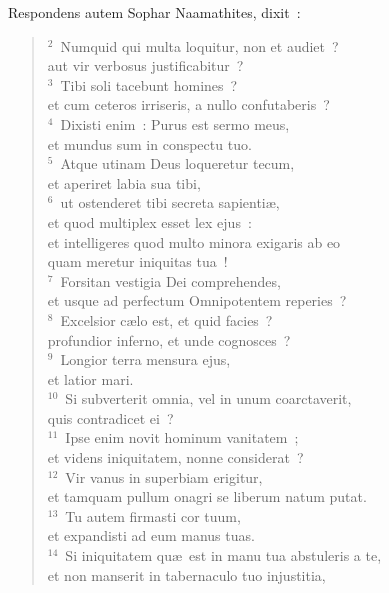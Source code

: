 \lettrine[lines=10,image=true,loversize=0.05,lraise=-0.03]{R}{}espondens autem Sophar Naamathites, dixit~:
\begin{flushleft}\begin{verse}\vspace{6pt}${}^{2}$~Numquid qui multa loquitur, non et audiet~?\\ aut vir verbosus justificabitur~?\\
${}^{3}$~Tibi soli tacebunt homines~?\\ et cum ceteros irriseris, a nullo confutaberis~?\\
${}^{4}$~Dixisti enim~: Purus est sermo meus,\\ et mundus sum in conspectu tuo.\\
${}^{5}$~Atque utinam Deus loqueretur tecum,\\ et aperiret labia sua tibi,\\
${}^{6}$~ut ostenderet tibi secreta sapienti\ae ,\\ et quod multiplex esset lex ejus~:\\ et intelligeres quod multo minora exigaris ab eo\\ quam meretur iniquitas tua~!\\
${}^{7}$~Forsitan vestigia Dei comprehendes,\\ et usque ad perfectum Omnipotentem reperies~?\\
${}^{8}$~Excelsior c\ae lo est, et quid facies~?\\ profundior inferno, et unde cognosces~?\\
${}^{9}$~Longior terra mensura ejus,\\ et latior mari.\\
${}^{10}$~Si subverterit omnia, vel in unum coarctaverit,\\ quis contradicet ei~?\\
${}^{11}$~Ipse enim novit hominum vanitatem~;\\ et videns iniquitatem, nonne considerat~?\\
${}^{12}$~Vir vanus in superbiam erigitur,\\ et tamquam pullum onagri se liberum natum putat.\\
${}^{13}$~Tu autem firmasti cor tuum,\\ et expandisti ad eum manus tuas.\\
${}^{14}$~Si iniquitatem qu\ae\ est in manu tua abstuleris a te,\\ et non manserit in tabernaculo tuo injustitia,\\

\end{verse}
\end{flushleft}

